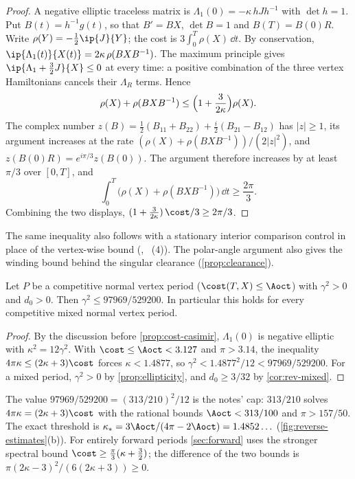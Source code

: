 \begin{proof}
A negative elliptic traceless matrix is $\Lambda_1(0)=-\kappa\,hJh^{-1}$ with $\det h=1$. Put $B(t)=h^{-1}g(t)$, so that $B'=BX$, $\det B=1$ and
$B(T)=B(0)R$. Write $\rho(Y)=-\frac12\ip{J}{Y}$; the cost is $3\int_0^T\rho(X)\,\dd t$. By
conservation, $\ip{\Lambda_1(t)}{X(t)}=2\kappa\,\rho(BXB^{-1})$. The maximum principle gives
$\ip{\Lambda_1+\frac32J}{X}\le0$ at every time: a positive combination of the three vertex
Hamiltonians cancels their $\Lambda_R$ terms. Hence
\[
  \rho(X)+\rho(BXB^{-1})\le\Bigl(1+\frac{3}{2\kappa}\Bigr)\rho(X).
\]
The complex number $z(B)=\frac12(B_{11}+B_{22})+\frac i2(B_{21}-B_{12})$ has $|z|\ge1$, its
argument increases at the rate $(\rho(X)+\rho(BXB^{-1}))/(2|z|^2)$, and
$z(B(0)R)=e^{i\pi/3}z(B(0))$. The argument therefore increases by at least $\pi/3$ over $[0,T]$,
and
\[
  \int_0^T\bigl(\rho(X)+\rho(BXB^{-1})\bigr)\,\dd t\ge\frac{2\pi}{3}.
\]
Combining the two displays, $(1+\frac3{2\kappa})\,\cost/3\ge2\pi/3$.
\end{proof}

The same inequality also follows with a stationary interior comparison control in place of
the vertex-wise bound (\cite{Notes}, ~(4)). The polar-angle argument
also gives the winding bound behind the singular clearance (\cref{prop:clearance}).

\begin{corollary}\label{cor:casimir-cap}
Let $P$ be a competitive normal vertex period ($\cost(T,X)\le\Aoct$) with $\gamma^2>0$ and
$d_0>0$. Then $\gamma^2\le97969/529200$. In particular this
holds for every competitive mixed normal vertex period.
\end{corollary}

\begin{proof}
By the discussion before \cref{prop:cost-casimir}, $\Lambda_1(0)$ is negative elliptic with
$\kappa^2=12\gamma^2$. With $\cost\le\Aoct<3.127$ and $\pi>3.14$, the inequality
$4\pi\kappa\le(2\kappa+3)\cost$ forces $\kappa<1.4877$, so $\gamma^2<1.4877^2/12<97969/529200$.
For a mixed period, $\gamma^2>0$ by \cref{prop:ellipticity}, and $d_0\ge3/32$ by
\cref{cor:rev-mixed}.
\end{proof}

The value $97969/529200=(313/210)^2/12$ is the notes' cap: $313/210$ solves
$4\pi\kappa=(2\kappa+3)\cost$ with the rational bounds $\Aoct<313/100$ and $\pi>157/50$. The
exact threshold is $\kappa_*=3\Aoct/(4\pi-2\Aoct)=1.4852\ldots$ (\cref{fig:reverse-estimates}(b)).
For entirely forward periods \cref{sec:forward} uses the stronger spectral bound
$\cost\ge\frac\pi3(\kappa+\frac32)$; the difference of the
two bounds is $\pi(2\kappa-3)^2/(6(2\kappa+3))\ge0$.

